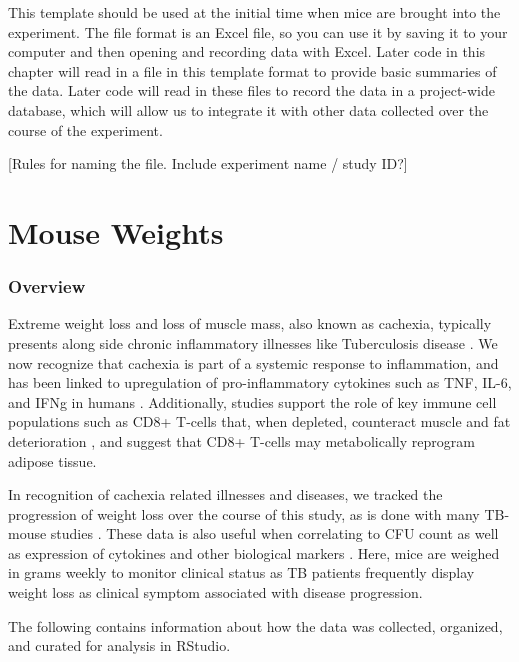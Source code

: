 \documentclass[
]{book}
\begin{document}
This template should be used at the
initial time when mice are brought into the experiment. The file format is an
Excel file, so you can use it by saving it to your computer and then opening and
recording data with Excel. Later code in this chapter will read in a file in
this template format to provide basic summaries of the data. Later code will
read in these files to record the data in a project-wide database, which will
allow us to integrate it with other data collected over the course of the
experiment.

{[}Rules for naming the file. Include experiment name / study ID?{]}

\hypertarget{mouse-weights}{%
\chapter{Mouse Weights}\label{mouse-weights}}

\hypertarget{overview-1}{%
\subsection{Overview}\label{overview-1}}

Extreme weight loss and loss of muscle mass, also known as cachexia, typically presents along side chronic inflammatory illnesses like Tuberculosis disease \citep{baazim2022interplay}. We now recognize that cachexia is part of a systemic response to inflammation, and has been linked to upregulation of pro-inflammatory cytokines such as TNF, IL-6, and IFNg in humans \citep{baazim2022interplay}. Additionally, studies support the role of key immune cell populations such as CD8+ T-cells that, when depleted, counteract muscle and fat deterioration \citep{baazim2019cd8}, and suggest that CD8+ T-cells may metabolically reprogram adipose tissue.

In recognition of cachexia related illnesses and diseases, we tracked the progression of weight loss over the course of this study, as is done with many TB-mouse studies \citep{smith2022host, segueni2016controlled}. These data is also useful when correlating to CFU count as well as expression of cytokines and other biological markers \citep{smith2022host}. Here, mice are weighed in grams weekly to monitor clinical status as TB patients frequently display weight loss as clinical symptom associated with disease progression.

The following contains information about how the data was collected, organized, and curated for analysis in RStudio.
\end{document}
